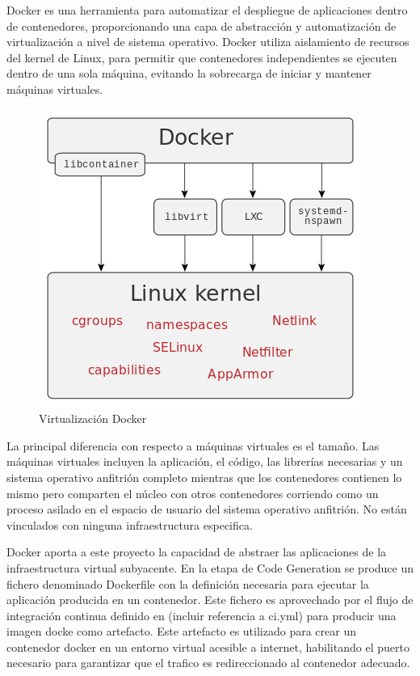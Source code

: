 \documentclass[a4paper,11pt]{book}
\begin{document}
Docker\cite{dk} es una herramienta para automatizar el despliegue de aplicaciones dentro de contenedores, proporcionando una capa de abstracción y automatización de virtualización a nivel de sistema operativo. Docker utiliza aislamiento de recursos del kernel de Linux, para permitir que contenedores independientes se ejecuten dentro de una sola máquina, evitando la sobrecarga de iniciar y mantener máquinas virtuales.

\begin{figure}[H] 
\centering 
\includegraphics[scale=0.35]{imagenes/docker.png}
\caption{ Virtualización Docker\cite{dkw}}
\end{figure}

La principal diferencia con respecto a máquinas virtuales es el tamaño. Las máquinas virtuales incluyen la aplicación, el código, las librerías necesarias y un sistema operativo anfitrión completo mientras que los contenedores contienen lo mismo pero comparten el núcleo con otros contenedores corriendo como un proceso asilado en el espacio de usuario del sistema operativo anfitrión. No están vinculados con ninguna infraestructura especifica. 

Docker aporta a este proyecto la capacidad de abstraer las aplicaciones de la infraestructura virtual subyacente. En la etapa de Code Generation se produce un fichero denominado Dockerfile con la definición necesaria para ejecutar la aplicación producida en un contenedor. Este fichero es aprovechado  por el flujo de integración continua definido en (incluir referencia a ci.yml)  para producir una imagen docke como artefacto. Este artefacto es utilizado para crear un contenedor docker en un entorno virtual acesible a internet, habilitando el puerto necesario para garantizar que el trafico es redireccionado al contenedor adecuado. 
\end{document}
